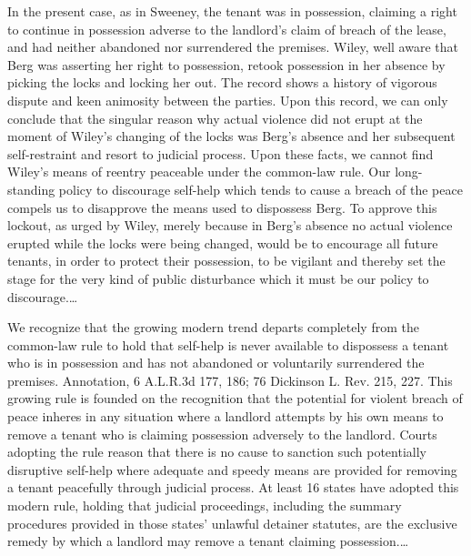 In the present case, as in Sweeney, the tenant was in possession, claiming a
right to continue in possession adverse to the landlord's claim of breach of
the lease, and had neither abandoned nor surrendered the premises. Wiley, well
aware that Berg was asserting her right to possession, retook possession in her
absence by picking the locks and locking her out. The record shows a history of
vigorous dispute and keen animosity between the parties. Upon this record, we
can only conclude that the singular reason why actual violence did not erupt at
the moment of Wiley's changing of the locks was Berg's absence and her
subsequent self-restraint and resort to judicial process. Upon these facts, we
cannot find Wiley's means of reentry peaceable under the common-law rule. Our
long-standing policy to discourage self-help which tends to cause a breach of
the peace compels us to disapprove the means used to dispossess Berg. To
approve this lockout, as urged by Wiley, merely because in Berg's absence no
actual violence erupted while the locks were being changed, would be to
encourage all future tenants, in order to protect their possession, to be
vigilant and thereby set the stage for the very kind of public disturbance
which it must be our policy to discourage.\ldots 

We recognize that the growing modern trend departs completely from the
common-law rule to hold that self-help is never available to dispossess a
tenant who is in possession and has not abandoned or voluntarily surrendered
the premises. Annotation, 6 A.L.R.3d 177, 186; 76 Dickinson L. Rev. 215, 227.
This growing rule is founded on the recognition that the potential for violent
breach of peace inheres in any situation where a landlord attempts by his own
means to remove a tenant who is claiming possession adversely to the landlord.
Courts adopting the rule reason that there is no cause to sanction such
potentially disruptive self-help where adequate and speedy means are provided
for removing a tenant peacefully through judicial process. At least 16 states
have adopted this modern rule, holding that judicial proceedings, including the
summary procedures provided in those states' unlawful detainer statutes, are
the exclusive remedy by which a landlord may remove a tenant claiming
possession.\ldots 

